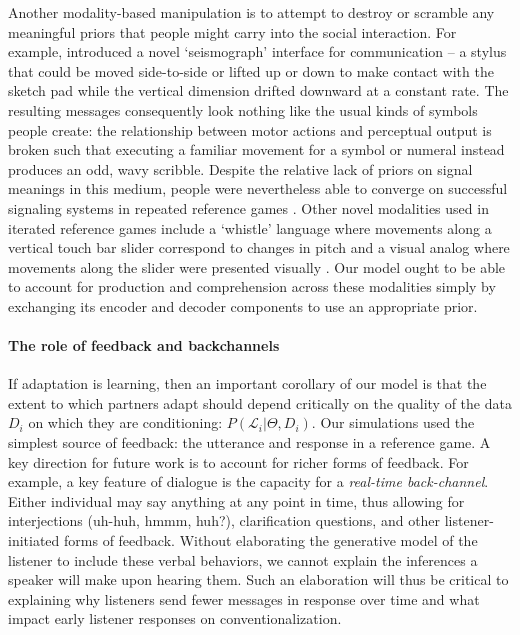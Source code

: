 Another modality-based manipulation is to attempt to destroy or scramble any meaningful priors that people might carry into the social interaction.
For example,  introduced a novel `seismograph' interface for communication -- a stylus that could be moved side-to-side or lifted up or down to make contact with the sketch pad while the vertical dimension drifted downward at a constant rate.
The resulting messages consequently look nothing like the usual kinds of symbols people create: the relationship between motor actions and perceptual output is broken such that executing a familiar movement for a symbol or numeral instead produces an odd, wavy scribble.
Despite the relative lack of priors on signal meanings in this medium, people were nevertheless able to converge on successful signaling systems in repeated reference games \cite{RobertsGalantucci12_DualityOfPatterning,RobertsEtAl15_IconocityOnCombinatoriality}.
Other novel modalities used in iterated reference games include a `whistle' language where movements along a vertical touch bar slider correspond to changes in pitch \cite{VerhoefRobertsDingemanse15_Iconicity} and a visual analog where movements along the slider were presented visually \cite{VerhoefEtAl16_TemporalLanguage}.
Our model ought to be able to account for production and comprehension across these modalities simply by exchanging its encoder and decoder components to use an appropriate prior.

\paragraph{The role of feedback and backchannels}

If adaptation is learning, then an important corollary of our model is that the extent to which partners adapt should depend critically on the quality of the data $D_i$ on which they are conditioning: $P(\mathcal{L}_i | \Theta, D_i)$.
Our simulations used the simplest source of feedback: the utterance and response in a reference game.
A key direction for future work is to account for richer forms of feedback.
For example, a key feature of dialogue is the capacity for a \emph{real-time back-channel}.
Either individual may say anything at any point in time, thus allowing for interjections (uh-huh, hmmm, huh?), clarification questions, and other listener-initiated forms of feedback. 
Without elaborating the generative model of the listener to include these verbal behaviors, we cannot explain the inferences a speaker will make upon hearing them.
Such an elaboration will thus be critical to explaining why listeners send fewer messages in response over time and what impact early listener responses on conventionalization. 

